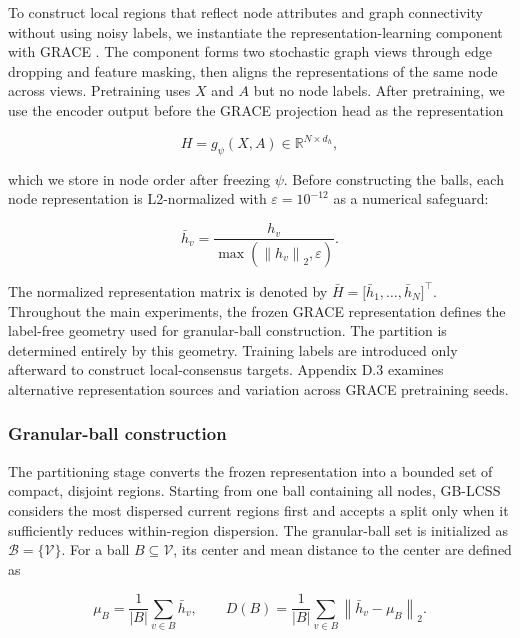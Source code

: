 \documentclass[10pt,letterpaper]{elsarticle}
\begin{document}
To construct local regions that reflect node attributes and graph connectivity without using noisy labels, we instantiate the representation-learning component with GRACE \cite{ref16}. The component forms two stochastic graph views through edge dropping and feature masking, then aligns the representations of the same node across views. Pretraining uses \(X\) and \(A\) but no node labels. After pretraining, we use the encoder output before the GRACE projection head as the representation

\begin{equation}\label{eq:2}
H = g_{\psi}(X,A) \in \mathbb{R}^{N \times d_{h}},
\end{equation}

which we store in node order after freezing \(\psi\). Before constructing the balls, each node representation is L2-normalized with \(\varepsilon = 10^{- 12}\) as a numerical safeguard:

\begin{equation}\label{eq:3}
{\bar{h}}_{v} = \frac{h_{v}}{\max(\left\| h_{v} \right\|_{2},\varepsilon)}.
\end{equation}

The normalized representation matrix is denoted by \(\bar{H} = \lbrack{\bar{h}}_{1},\ldots,{\bar{h}}_{N}\rbrack^{\top}\). Throughout the main experiments, the frozen GRACE representation defines the label-free geometry used for granular-ball construction. The partition is determined entirely by this geometry. Training labels are introduced only afterward to construct local-consensus targets. Appendix D.3 examines alternative representation sources and variation across GRACE pretraining seeds.

\subsubsection{Granular-ball construction}\label{sec:3.3.2}

The partitioning stage converts the frozen representation into a bounded set of compact, disjoint regions. Starting from one ball containing all nodes, GB-LCSS considers the most dispersed current regions first and accepts a split only when it sufficiently reduces within-region dispersion. The granular-ball set is initialized as \(\mathcal{B} = \{\mathcal{V}\}\). For a ball \(B \subseteq \mathcal{V}\), its center and mean distance to the center are defined as

\begin{equation}\label{eq:4}
\mu_{B} = \frac{1}{|B|}\sum_{v \in B}{\bar{h}}_{v},\quad\quad D(B) = \frac{1}{|B|}\sum_{v \in B}\left\| {\bar{h}}_{v} - \mu_{B} \right\|_{2}.
\end{equation}
\end{document}
